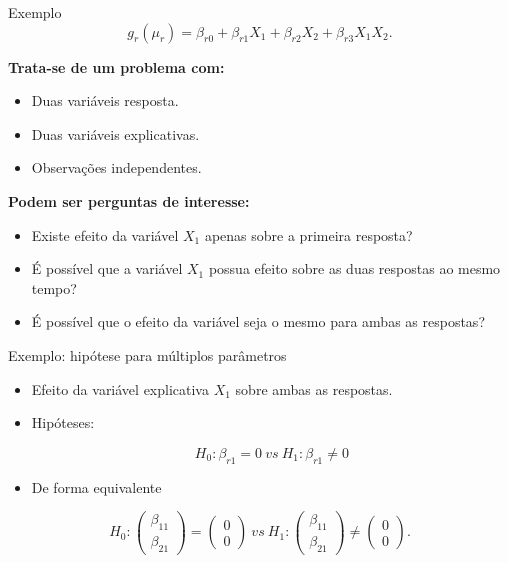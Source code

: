 \documentclass[
  ignorenonframetext,
  serif,
  professionalfont,
  usenames,
  dvipsnames,
  aspectratio = 169]{beamer}
\def\endColumns{\end{minipage}}%
\def\beginAHalfColumnT{\begin{minipage}[t]{0.49\textwidth}}%
\begin{document}
\begin{frame}{Exemplo}
\protect\hypertarget{exemplo-1}{}
\[
g_r(\mu_r) = \beta_{r0} + \beta_{r1} X_1 + \beta_{r2} X_2 + \beta_{r3} X_1X_2.
\]

\beginAHalfColumnT

\textbf{Trata-se de um problema com:}

\begin{itemize}
  \itemsep 1ex
  \item Duas variáveis resposta.
  \item Duas variáveis explicativas.
  \item Observações independentes.
\end{itemize}

\endColumns
\beginAHalfColumnT

\textbf{Podem ser perguntas de interesse:}

\begin{itemize}
  \itemsep 1ex
  \item Existe efeito da variável $X_1$ apenas sobre a primeira resposta?
  \item É possível que a variável $X_1$ possua efeito sobre as duas respostas ao mesmo tempo?
  \item É possível que o efeito da variável seja o mesmo para ambas as respostas? 
\end{itemize}

\endColumns
\end{frame}

\begin{frame}{Exemplo: hipótese para múltiplos parâmetros}
\protect\hypertarget{exemplo-hipuxf3tese-para-muxfaltiplos-paruxe2metros}{}
\begin{itemize}
  \itemsep 2ex
  
  \item Efeito da variável explicativa $X_1$ sobre ambas as respostas.
  
  \item Hipóteses: 
  
$$H_0: \beta_{r1} = 0 \ vs \ H_1: \beta_{r1} \neq 0$$  

  \item De forma equivalente

\end{itemize}

\[
H_0: 
\begin{pmatrix}
\beta_{11} \\ 
\beta_{21}
\end{pmatrix} 
= 
\begin{pmatrix}
0 \\ 
0
\end{pmatrix}
\ vs \ 
H_1: 
\begin{pmatrix}
\beta_{11} \\ 
\beta_{21}
\end{pmatrix} 
\neq
\begin{pmatrix}
0 \\ 
0 
\end{pmatrix}.
\]
\end{frame}
\end{document}

